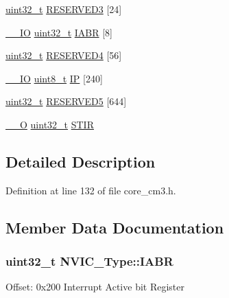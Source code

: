 \begin{DoxyCompactItemize}
\item 
\hyperlink{_p_e___types_8h_a33594304e786b158f3fb30289278f5af}{uint32\+\_\+t} \hyperlink{struct_n_v_i_c___type_a37554ccda2b131e7528232e9150b1c4f}{R\+E\+S\+E\+R\+V\+E\+D3} \mbox{[}24\mbox{]}
\item 
\hyperlink{group___c_m_s_i_s___c_m3__core__definitions_gaec43007d9998a0a0e01faede4133d6be}{\+\_\+\+\_\+\+IO} \hyperlink{_p_e___types_8h_a33594304e786b158f3fb30289278f5af}{uint32\+\_\+t} \hyperlink{struct_n_v_i_c___type_ac86c5bac0af593beb8004ab0ff9097bc}{I\+A\+BR} \mbox{[}8\mbox{]}
\item 
\hyperlink{_p_e___types_8h_a33594304e786b158f3fb30289278f5af}{uint32\+\_\+t} \hyperlink{struct_n_v_i_c___type_a8e4a797aa0743ebeba14962c77d2e7ab}{R\+E\+S\+E\+R\+V\+E\+D4} \mbox{[}56\mbox{]}
\item 
\hyperlink{group___c_m_s_i_s___c_m3__core__definitions_gaec43007d9998a0a0e01faede4133d6be}{\+\_\+\+\_\+\+IO} \hyperlink{_p_e___types_8h_aba7bc1797add20fe3efdf37ced1182c5}{uint8\+\_\+t} \hyperlink{struct_n_v_i_c___type_a3ca7b7ff6aa6094772e524887739bf37}{IP} \mbox{[}240\mbox{]}
\item 
\hyperlink{_p_e___types_8h_a33594304e786b158f3fb30289278f5af}{uint32\+\_\+t} \hyperlink{struct_n_v_i_c___type_ad0598b9cd851203ff328a9c7c347f1b6}{R\+E\+S\+E\+R\+V\+E\+D5} \mbox{[}644\mbox{]}
\item 
\hyperlink{group___c_m_s_i_s___c_m3__core__definitions_ga7e25d9380f9ef903923964322e71f2f6}{\+\_\+\+\_\+O} \hyperlink{_p_e___types_8h_a33594304e786b158f3fb30289278f5af}{uint32\+\_\+t} \hyperlink{struct_n_v_i_c___type_a0b0d7f3131da89c659a2580249432749}{S\+T\+IR}
\end{DoxyCompactItemize}


\subsection{Detailed Description}


Definition at line 132 of file core\+\_\+cm3.\+h.



\subsection{Member Data Documentation}
\subsubsection[{\texorpdfstring{I\+A\+BR}{IABR}}]{ {\bf uint32\+\_\+t} N\+V\+I\+C\+\_\+\+Type\+::\+I\+A\+BR}\hypertarget{struct_n_v_i_c___type_ac86c5bac0af593beb8004ab0ff9097bc}{}\label{struct_n_v_i_c___type_ac86c5bac0af593beb8004ab0ff9097bc}
Offset\+: 0x200 Interrupt Active bit Register 

